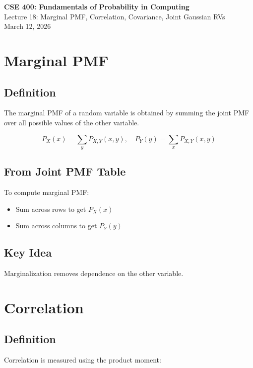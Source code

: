 \documentclass[11pt]{article}
\begin{document}
\begin{center}
    \Large \textbf{CSE 400: Fundamentals of Probability in Computing} \\
    \large Lecture 18: Marginal PMF, Correlation, Covariance, Joint Gaussian RVs \\
    \normalsize March 12, 2026
\end{center}

\vspace{0.5cm}

\section{Marginal PMF}

\subsection{Definition}
The marginal PMF of a random variable is obtained by summing the joint PMF over all possible values of the other variable.

\[
P_X(x) = \sum_y P_{X,Y}(x,y), \quad
P_Y(y) = \sum_x P_{X,Y}(x,y)
\]

\subsection{From Joint PMF Table}
To compute marginal PMF:
\begin{itemize}
    \item Sum across rows to get $P_X(x)$
    \item Sum across columns to get $P_Y(y)$
\end{itemize}

\subsection{Key Idea}
Marginalization removes dependence on the other variable.

\section{Correlation}

\subsection{Definition}
Correlation is measured using the product moment:
\end{document}
